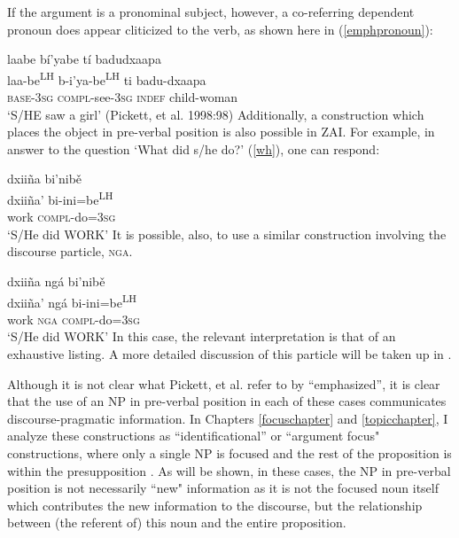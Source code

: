\z
If the argument is a pronominal subject, however, a co-referring dependent pronoun does appear cliticized to the verb, as shown here in (\ref{emphpronoun}):

\ea\label{emphpronoun}
\glll laabe b\'{i}'yabe t\'{i} badudxaapa \\		
laa-be\textsuperscript{LH} b-i'ya-be\textsuperscript{LH} ti badu-dxaapa \\
\textsc{base}-3\textsc{sg} \textsc{compl}-see-3\textsc{sg} \textsc{indef} child-woman \\
\glt `S/HE saw a girl' \hfill (Pickett, et al. 1998:98)
\z
Additionally, a construction which places the object in pre-verbal position is also possible in ZAI. For example, in answer to the question `What did s/he do?' (\ref{wh}), one can respond:

\ea\label{preverbalobj}
\glll dxii\~{n}a bi'nib\v{e} \\
dxii\~{n}a' bi-ini=be\textsuperscript{LH} \\
work \textsc{compl}-do=\textsc{3sg} \\
\glt `S/He did WORK'
\z 
It is possible, also, to use a similar construction involving the discourse particle, \textsc{nga}.  

\ea\label{preverbalnga}
\glll dxii\~{n}a ng\'{a} bi'nib\v{e} \\
dxii\~{n}a' ng\'{a} bi-ini=be\textsuperscript{LH} \\
work \textsc{nga} \textsc{compl}-do=\textsc{3sg} \\
\glt `S/He did WORK'
\z 
In this case, the relevant interpretation is that of an exhaustive listing. A more detailed discussion of this particle will be taken up in .

Although it is not clear what Pickett, et al. refer to by ``emphasized'', it is clear that the use of an NP in pre-verbal position in each of these cases communicates discourse-pragmatic information. In Chapters \ref{focuschapter} and \ref{topicchapter}, I analyze these constructions as ``identificational'' or ``argument focus" constructions, where only a single NP is focused and the rest of the proposition is within the presupposition \citep[228-233]{lambrecht1994}. As will be shown, in these cases, the NP in pre-verbal position is not necessarily ``new" information as it is not the focused noun itself which contributes the new information to the discourse, but the relationship between (the referent of) this noun and the entire proposition.  


